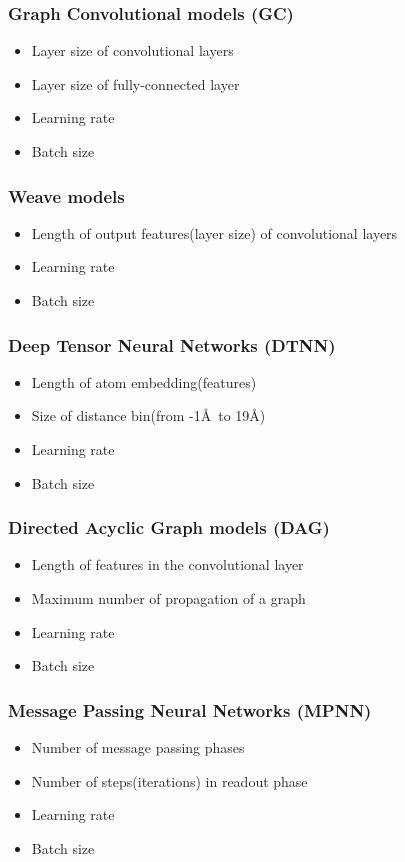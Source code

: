 \subsubsection{Graph Convolutional models (GC)}
\begin{itemize}
    \item Layer size of convolutional layers
    \item Layer size of fully-connected layer
    \item Learning rate
    \item Batch size
\end{itemize}

\subsubsection{Weave models}
\begin{itemize}
    \item Length of output features(layer size) of convolutional layers
    \item Learning rate
    \item Batch size
\end{itemize}

\subsubsection{Deep Tensor Neural Networks (DTNN)}
\begin{itemize}
    \item Length of atom embedding(features)
    \item Size of distance bin(from -1\AA~to 19\AA)
    \item Learning rate
    \item Batch size
\end{itemize}

\subsubsection{Directed Acyclic Graph models (DAG)}
\begin{itemize}
    \item Length of features in the convolutional layer
    \item Maximum number of propagation of a graph
    \item Learning rate
    \item Batch size
\end{itemize}

\subsubsection{Message Passing Neural Networks (MPNN)}
\begin{itemize}
    \item Number of message passing phases
    \item Number of steps(iterations) in readout phase
    \item Learning rate
    \item Batch size
\end{itemize}

